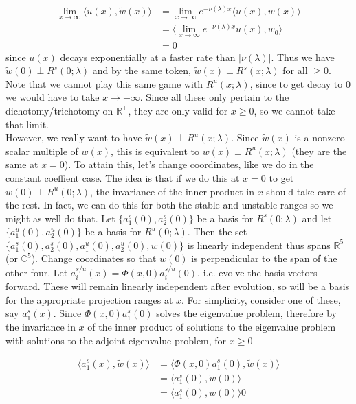 \documentclass[12pt]{article}
\def\R{{\mathbb R}}
\def\C{{\mathbb C}}
\begin{document}
\begin{align*}
\lim_{x \rightarrow \infty} \langle u(x), \tilde{w}(x) \rangle &= \lim_{x \rightarrow \infty} e^{-\nu(\lambda) x} \langle u(x), w(x) \rangle \\
&= \langle \lim_{x \rightarrow \infty} e^{-\nu(\lambda) x} u(x), w_0 \rangle \\
&= 0
\end{align*}
since $u(x)$ decays exponentially at a faster rate than $|\nu(\lambda)|$. Thus we have $\tilde{w}(0) \perp R^s(0; \lambda)$ and by the same token, $\tilde{w}(x) \perp R^s(x; \lambda)$ for all $ \geq 0$.\\

Note that we cannot play this same game with $R^u(x; \lambda)$, since to get decay to 0 we would have to take $x \rightarrow -\infty$. Since all these only pertain to the dichotomy/trichotomy on $\R^+$, they are only valid for $x \geq 0$, so we cannot take that limit.\\

However, we really want to have $\tilde{w}(x) \perp R^u(x; \lambda)$. Since $\tilde{w}(x)$ is a nonzero scalar multiple of $w(x)$, this is equivalent to $w(x) \perp R^u(x; \lambda)$ (they are the same at $x = 0$). To attain this, let's change coordinates, like we do in the constant coeffient case. The idea is that if we do this at $x = 0$ to get $w(0) \perp R^u(0; \lambda)$, the invariance of the inner product in $x$ should take care of the rest. In fact, we can do this for both the stable and unstable ranges so we might as well do that. Let $\{ a^s_1(0), a^s_2(0)\}$ be a basis for $R^s(0; \lambda)$ and let $\{a^u_1(0), a^u_2(0)\}$ be a basis for $R^u(0; \lambda)$. Then the set $\{ a^s_1(0), a^s_2(0),a^u_1(0), a^u_2(0), w(0) \}$ is linearly independent thus spans $\R^5$ (or $\C^5$). Change coordinates so that $w(0)$ is perpendicular to the span of the other four. Let $a^{s/u}_i(x) = \Phi(x,0)a^{s/u}_i(0)$, i.e. evolve the basis vectors forward. These will remain linearly independent after evolution, so will be a basis for the appropriate projection ranges at $x$. For simplicity, consider one of these, say $a^s_1(x)$. Since $\Phi(x,0) a^s_1(0)$ solves the eigenvalue problem, therefore by the invariance in $x$ of the inner product of solutions to the eigenvalue problem with solutions to the adjoint eigenvalue problem, for $x \geq 0$

\begin{align*}
\langle a^s_1(x), \tilde{w}(x) \rangle &= \langle \Phi(x,0) a^s_1(0), \tilde{w}(x) \rangle \\
&= \langle a^s_1(0), \tilde{w}(0) \rangle \\
&= \langle a^s_1(0), w(0) \rangle 0
\end{align*}
\end{document}
